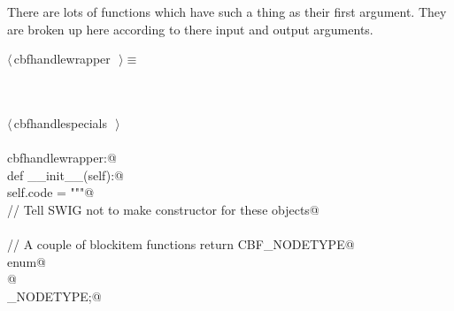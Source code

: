 \documentclass[10pt,a4paper,twoside,notitlepage]{article}
\begin{document}
There are lots of functions which have such a thing as their
first argument. They are broken up here according to 
there input and output arguments.


\begin{flushleft} \small \label{scrap9}
$\langle\,$cbfhandlewrapper\nobreak\ {\footnotesize {}}$\,\rangle\equiv$
\vspace{-1ex}
\begin{list}{}{} \item
\mbox{}\verb@@\\
\mbox{}\verb@@\\
\mbox{}\verb@@\hbox{$\langle\,$cbfhandlespecials\nobreak\ {\footnotesize {}}$\,\rangle$}\verb@@\\
\mbox{}\verb@@\\
\mbox{}\verb@class cbfhandlewrapper:@\\
\mbox{}\verb@   def __init__(self):@\\
\mbox{}\verb@      self.code = """@\\
\mbox{}\verb@// Tell SWIG not to make constructor for these objects@\\
\mbox{}\verb@%nodefault cbf_handle;@\\
\mbox{}\verb@%nodefault cbf_handle_struct;@\\
\mbox{}\verb@%nodefault cbf_node;@\\
\mbox{}\verb@@\\
\mbox{}\verb@// A couple of blockitem functions return CBF_NODETYPE@\\
\mbox{}\verb@typedef enum@\\
\mbox{}@\\
\mbox{}\verb@CBF_NODETYPE;@\\
\mbox{}\verb@@\\
\mbox{}\verb@@\\

\end{list}
\end{flushleft}
\end{document}
